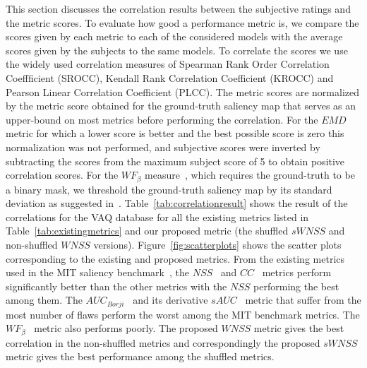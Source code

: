 \documentclass[12pt,onecolumn,journal,	draftclsnofoot]{IEEEtran}
\begin{document}
This section discusses the correlation results  between the subjective ratings and the metric scores. To evaluate how good a performance metric is, we compare the scores given by each metric to each of the considered models  with the average scores given by the subjects to the same models. To correlate the scores we use the widely used correlation measures of  Spearman Rank Order Correlation Coeffficient (SROCC), Kendall Rank Correlation Coefficient (KROCC) and Pearson Linear Correlation Coefficient (PLCC).
 The metric scores are normalized by the metric score obtained for the ground-truth saliency map that serves as an upper-bound on most metrics before performing the correlation.   For the $EMD$ metric for which a lower score is better and the best possible score is zero this normalization was not performed, and subjective scores were inverted by subtracting the scores from the maximum subject score of 5 to obtain positive correlation scores. For the $WF_{\beta}$ measure~\cite{margolin2014evaluate}, which requires the ground-truth to be a binary mask, we threshold the ground-truth saliency map by its standard deviation as suggested in~\cite{Moorthy_Bovik}.  Table~\ref{tab:correlationresult} shows the result of the correlations for the  VAQ  database for all the existing metrics listed in Table~\ref{tab:existingmetrics} and our proposed metric (the shuffled $sWNSS$ and non-shuffled $WNSS$ versions).  Figure~\ref{fig:scatterplots} shows the scatter plots corresponding to the existing and proposed metrics. From the existing metrics used in the MIT saliency benchmark~\cite{mit-saliency-benchmark}, the $NSS$~\cite{NSS} and $CC$~\cite{borjieval} metrics perform significantly better than the other metrics with the $NSS$ performing the best among them. The $AUC_{Borji}$~\cite{borjieval} and its derivative $sAUC$~\cite{borjieval} metric that suffer from the most number of flaws perform the worst among the MIT benchmark metrics. The $WF_{\beta}$~\cite{margolin2014evaluate} metric also performs poorly.  The proposed  $WNSS$ metric gives the best correlation in the non-shuffled metrics and correspondingly the proposed $sWNSS$ metric gives the best performance among the shuffled metrics.
\end{document}

